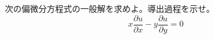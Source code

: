 
次の偏微分方程式の一般解を求めよ。導出過程を示せ。
\[
x\frac{\partial u}{\partial x} - y\frac{\partial u}{\partial y} = 0
\]
